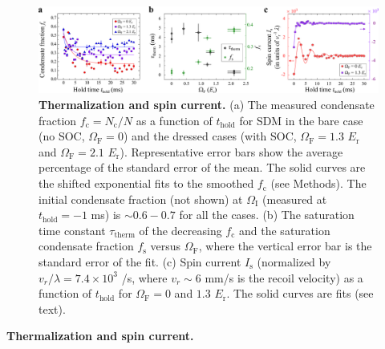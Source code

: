 \documentclass[showpacs,preprintnumbers,amsmath,amssymb, superscriptaddress, aps, reprint]{revtex4-1}
\def\E_r{E_{\text{r}}}
\def\OmegaF{\Omega_{\text{F}}}
\def\OmegaI{\Omega_{\text{I}}}
\def\thold{t_{\text{hold}}}
\begin{document}
{\begin{figure}[ht]
\centering
\includegraphics[width=7.0in]{Fig4_Vfinal.pdf}
\caption{\textbf{Thermalization and spin current.} (a) The measured condensate fraction ${f_{\text{c}}} = {N_{\text{c}}}/N$ as a function of $\thold$ for SDM in the bare case (no SOC, $\OmegaF = 0$) and the dressed cases (with SOC, $\OmegaF = 1.3$ $\E_r$ and $\OmegaF = 2.1$ $\E_r$). Representative error bars show the average percentage of the standard error of the mean. The solid curves are the shifted exponential fits to the smoothed $f_{\text{c}}$ (see Methods). The initial condensate fraction (not shown) at $\OmegaI$ (measured at $\thold = -1$ ms) is $\sim 0.6 - 0.7$ for all the cases. (b) The saturation time constant $\tau_{\text{therm}}$ of the decreasing $f_{\text{c}}$ and the saturation condensate fraction $f_{\text{s}}$ versus $\OmegaF$, where the vertical error bar is the standard error of the fit. (c) Spin current $I_{\text{s}}$ (normalized by ${v_r}/\lambda = 7.4 \times 10^3$ /s, where  $v_r \sim 6$ mm/s is the recoil velocity) as a function of $\thold$ for $\OmegaF = 0$ and $1.3$ $\E_r$. The solid curves are fits (see text).}
\label{Fig4}
\end{figure}


\vspace{5mm}

\textbf{Thermalization and spin current.}

}
\end{document}
